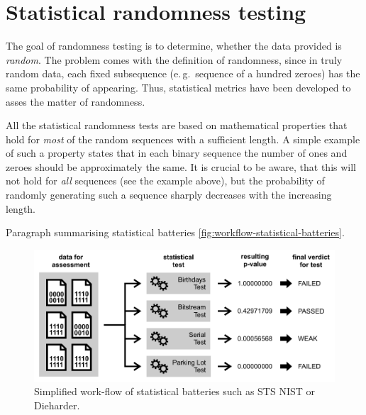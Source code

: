 \documentclass[12pt,oneside]{fithesis2}
\begin{document}
\chapter{Statistical randomness testing}
\label{chap:stat-rand-testing}

The goal of randomness testing is to determine, whether the data provided is \textit{random}. 
The problem comes with the definition of randomness, since in truly random data, 
each fixed subsequence (e.\,g.\ sequence of a hundred zeroes) has the same probability of appearing.
Thus, statistical metrics have been developed to asses the matter of randomness.

All the statistical randomness tests are based on mathematical properties that hold for
\textit{most} of the random sequences with a sufficient length.
A simple example of such a property states that in each binary sequence the number of ones and zeroes should be 
approximately the same. It is crucial to be aware, that this will not hold for \textit{all} sequences (see the example above),
but the probability of randomly generating such a sequence sharply decreases with the increasing length.

Paragraph summarising statistical batteries \autoref{fig:workflow-statistical-batteries}.

\begin{figure}[b!]
\centering
\includegraphics[width=\textwidth]{images/workflow-statistical-batteries}
\caption{Simplified work-flow of statistical batteries such as STS NIST or Dieharder.}
\label{fig:workflow-statistical-batteries}
\end{figure}
\end{document}
